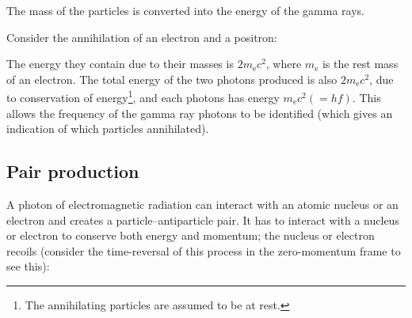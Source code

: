 \documentclass[a4paper,12pt]{article}
\begin{document}
The mass of the particles is converted into the energy of the gamma rays.

\noindent Consider the annihilation of an electron and a positron:\\


The energy they contain due to their masses is $2m_{\mathrm{e}}c^{2}$, where $m_{\mathrm{e}}$ is the rest mass of an electron.  The total energy of the two photons produced is also $2m_{\mathrm{e}}c^{2}$, due to conservation of energy\footnote{The annihilating particles are assumed to be at rest.}, and each photons has energy $m_{\mathrm{e}}c^{2}(=hf)$.  This allows the frequency of the gamma ray photons to be identified (which gives an indication of which particles annihilated).

\subsection{Pair production}

A photon of electromagnetic radiation can interact with an atomic nucleus or an electron and creates a particle--antiparticle pair.  It has to interact with a nucleus or electron to conserve both energy and momentum; the nucleus or electron recoils (consider the time-reversal of this process in the zero-momentum frame to see this):\\

\end{document}
